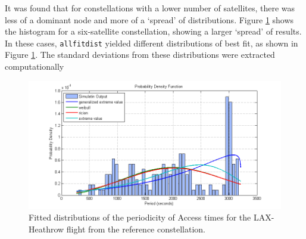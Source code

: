 It was found that for constellations with a lower number of satellites, there was less of a dominant node and more of a `spread' of distributions. Figure \ref{fig:allfitdist_Heathrow6sat} shows the histogram for a six-satellite constellation, showing a larger `spread' of results. In these cases, \verb|allfitdist| yielded different distributions of best fit, as shown in Figure \ref{fig:allfitdist_Heathrow6sat}. The standard deviations from these distributions were extracted computationally


\begin{figure}[htbp]
	\centering
	\includegraphics[scale = 0.8]{Pictures/allfitdist_Heathrow6sat.png}
	
	\caption{Fitted distributions of the periodicity of Access times for the LAX-Heathrow flight from the reference constellation. }
	\label{fig:allfitdist_Heathrow6sat}
\end{figure} 